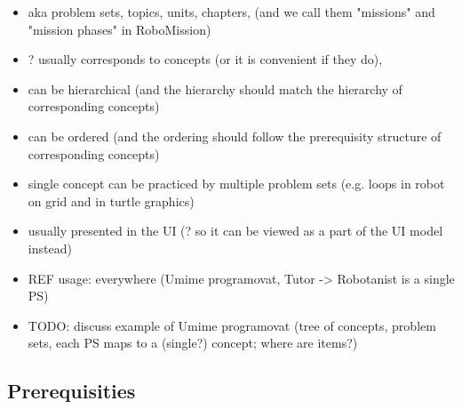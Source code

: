 \begin{itemize}
\item aka problem sets, topics, units, chapters,
  (and we call them "missions" and "mission phases" in RoboMission)
\item ? usually corresponds to concepts (or it is convenient if they do),
\item can be hierarchical (and the hierarchy should match the hierarchy of
  corresponding concepts)
\item can be ordered (and the ordering should follow the prerequisity structure
  of corresponding concepts)
\item single concept can be practiced by multiple problem sets
  (e.g. loops in robot on grid and in turtle graphics)
\item usually presented in the UI (? so it can be viewed as a part of the UI model instead)
\item REF usage: everywhere (Umime programovat, Tutor -> Robotanist is a single PS)
\item TODO: discuss example of Umime programovat (tree of concepts, problem
  sets, each PS maps to a (single?) concept; where are items?)
\end{itemize}


\subsection{Prerequisities}

